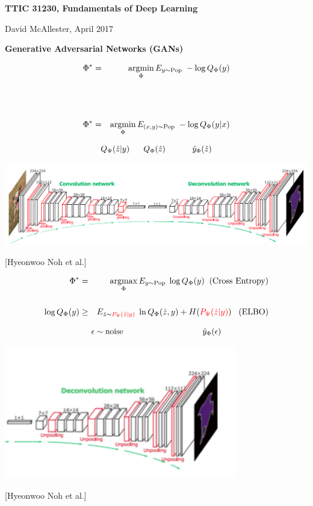 



{\Huge

  \centerline{\bf TTIC 31230, Fundamentals of Deep Learning}
  \bigskip
  \centerline{David McAllester, April 2017}
  \vfill
  \centerline{\bf Generative Adversarial Networks (GANs)}
  \vfill
\vfill
\vfill


{\color{red}
\begin{eqnarray*}
  \Phi^* & = & \operatorname*{argmin}_\Phi E_{y \sim \mathrm{Pop}} \;- \log Q_\Phi(y) \\
  \\
  \\
  \\
  \Phi^* & = & \operatorname*{argmin}_\Phi E_{(x,y) \sim \mathrm{Pop}} \;- \log Q_\Phi(y|x)
\end{eqnarray*}
}


\bigskip

$$Q_\Psi(\hat{z}|y) \hspace{4ex}  Q_\Phi(\hat{z}) \hspace{7ex} \;\hat{y}_\Phi(\hat{z})$$

\bigskip
\centerline{\includegraphics[width=6in]{../images/Deconv}}
\centerline{\large [Hyeonwoo Noh et al.]}
\bigskip
\begin{eqnarray*}
  \Phi^* & = & \operatorname*{argmax}_\Phi E_{y \sim \mathrm{Pop}} \;\log Q_\Phi(y) \;\; \mbox{(Cross Entropy)}\\
  \\
  \log Q_\Phi(y) & \geq & E_{\hat{z} \sim {\color{red} P_\Psi(\hat{z}|y)}}\;\ln Q_\Phi(\hat{z},y) + H({\color{red} P_\Psi(\hat{z}|y)})
  \;\;\;\mbox{(ELBO)}
\end{eqnarray*}


\bigskip
$$\epsilon \sim \mathrm{noise} \hspace{22ex} \;\hat{y}_\Phi(\epsilon)$$

\bigskip
\centerline{\includegraphics[width=4in]{../images/halfdeconv}}
\centerline{\large [Hyeonwoo Noh et al.]}

}
